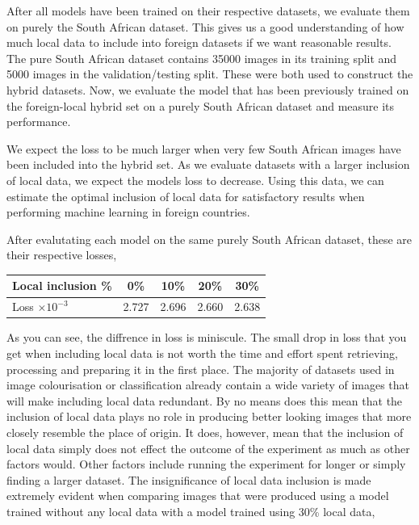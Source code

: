 \documentclass[conference]{IEEEtran}
\begin{document}
After all models have been trained on their respective datasets, we evaluate them on purely the South African dataset. This gives us a good understanding of how much local data to include into foreign datasets if we want reasonable results. The pure South African dataset contains 35000 images in its training split and 5000 images in the validation/testing split. These were both used to construct the hybrid datasets. Now, we evaluate the model that has been previously trained on the foreign-local hybrid set on a purely South African dataset and measure its performance.

We expect the loss to be much larger when very few South African images have been included into the hybrid set. As we evaluate datasets with a larger inclusion of local data, we expect the models loss to decrease. Using this data, we can estimate the optimal inclusion of local data for satisfactory results when performing machine learning in foreign countries.

After evalutating each model on the same purely South African dataset, these are their respective losses,

\begin{table}[h]
\centering
\renewcommand{\arraystretch}{1.5}
\begin{tabular}{|l||c|c|c|c|}
\hline 
Local inclusion \% & 0\% & 10\% & 20\% & 30\%  \\
\hline
Loss $\times 10^{-3}$& 2.727 & 2.696 & 2.660 & 2.638\\ 
\hline 
\end{tabular} 
\end{table}



As you can see, the diffrence in loss is miniscule. The small drop in loss that you get when including local data is not worth the time and effort spent retrieving, processing and preparing it in the first place. The majority of datasets used in image colourisation or classification already contain a wide variety of images that will make including local data redundant. By no means does this mean that the inclusion of local data plays no role in producing better looking images that more closely resemble the place of origin. It does, however, mean that the inclusion of local data simply does not effect the outcome of the experiment as much as other factors would. Other factors include running the experiment for longer or simply finding a larger dataset. The insignificance of local data inclusion is made extremely evident when comparing images that were produced using a model trained without any local data with a model trained using 30\% local data,
\end{document}
